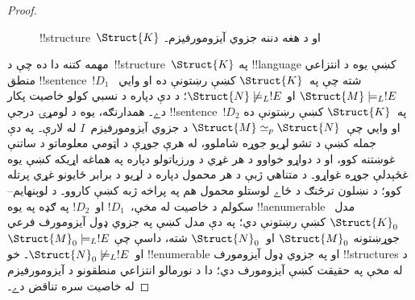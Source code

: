 \documentclass[../../../include/open-logic-section]{subfiles}
\begin{document}
\begin{proof}
\begin{figure}[h]
  \centering
  \caption{!!{structure}~$\Struct{K}$ او د هغه دننه جزوي
    آيزومورفيزم۔}
\end{figure}

مهمه کتنه دا ده چې د~!!{structure}~$\Struct{K}$ په !!{language} کښې يوه د
انتزاعي منطق !!{sentence}~$!D_1$ شته چې په~$\Struct{K}$ کښې رښتونې
ده او وايي~$\Struct{M} \models_L !E$ او
$\Struct{N} \not\models_L !E$؛ د دې دپاره د نسبي کولو خاصيت پکار
دے۔ همدارنګه، يوه د لومړۍ درجې !!{sentence}~$!D_2$ په~$\Struct{K}$
کښې رښتونې ده او وايي چې~$\Struct{M} \simeq_p \Struct{N}$ د جزوي
آيزومورفيزم~$I$ له لارې۔ په دې جمله کښې د تشو لړيو جوړه شاملوو، له هرې جوړې د اټومي معلوماتو د ساتنې غوښتنه کوو، او د دواړو خواوو د هر غړي د ورزياتولو دپاره په هماغه اړيکه کښې يوه غځېدلې جوړه غواړو۔ د متناهي ژبې د هر محمول دپاره د لړيو د برابر ځايونو غړي پرتله کوو؛ د نښلون ترڅنګ د ځاے لوستلو محمول هم په پراخه ژبه کښې کاروو۔ د لوېنهايم--سکولم د خاصيت له مخې،~$!D_1$
او~$!D_2$ په ګډه په يوه !!a{enumerable} مدل~$\Struct{K}_0$ کښې
رښتونې دي؛ په دې مدل کښې په جزوي ډول آيزومورف فرعي جوړښتونه
$\Struct{M}_0$ او~$\Struct{N}_0$ شته، داسې چې
$\Struct{M}_0 \models_L !E$ او~$\Struct{N}_0 \not\models_L !E$۔ خو
!!{enumerable} او په جزوي ډول آيزومورف !!{structure}s د
 له مخې په حقيقت کښې آيزومورف دي؛ دا د
نورمالو انتزاعي منطقونو د آيزومورفيزم له خاصيت سره تناقض دے۔
\end{proof}
\end{document}
